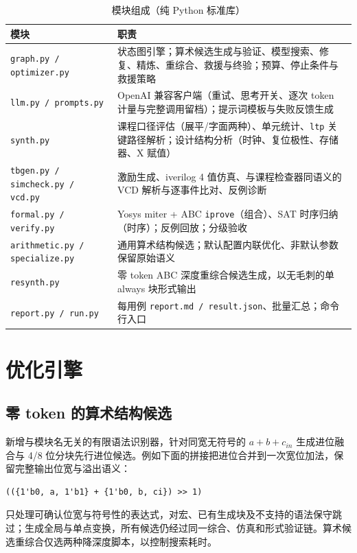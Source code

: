 \documentclass[UTF8,a4paper,zihao=5]{ctexart}
\newcommand{\code}[1]{\texttt{#1}}
\begin{document}
\begin{table}[h]\centering\small
\caption{模块组成（纯 Python 标准库）}
\begin{tabularx}{\linewidth}{@{}lX@{}}
\toprule
模块 & 职责 \\ \midrule
\code{graph.py / optimizer.py} & 状态图引擎；算术候选生成与验证、模型搜索、修复、精炼、重综合、救援与终验；预算、停止条件与救援策略 \\
\code{llm.py / prompts.py} & OpenAI 兼容客户端（重试、思考开关、逐次 token 计量与完整调用留档）；提示词模板与失败反馈生成 \\
\code{synth.py} & 课程口径评估（展平/字面两种）、单元统计、\code{ltp} 关键路径解析；设计结构分析（时钟、复位极性、存储器、X 赋值） \\
\code{tbgen.py / simcheck.py / vcd.py} & 激励生成、iverilog 4 值仿真、与课程检查器同语义的 VCD 解析与逐事件比对、反例诊断 \\
\code{formal.py / verify.py} & Yosys miter + ABC \code{iprove}（组合）、SAT 时序归纳（时序）；反例回放；分级验收 \\
\code{arithmetic.py / specialize.py} & 通用算术结构候选；默认配置内联优化、非默认参数保留原始语义 \\
\code{resynth.py} & 零 token ABC 深度重综合候选生成，以无毛刺的单 always 块形式输出 \\
\code{report.py / run.py} & 每用例 \code{report.md / result.json}、批量汇总；命令行入口 \\
\bottomrule
\end{tabularx}
\end{table}

\section{优化引擎}\label{sec:opt}

\subsection{零 token 的算术结构候选}
新增与模块名无关的有限语法识别器，针对同宽无符号的 $a+b+c_{in}$ 生成进位融合与 4/8 位分块先行进位候选。例如下面的拼接把进位合并到一次宽位加法，保留完整输出位宽与溢出语义：
\begin{lstlisting}
(({1'b0, a, 1'b1} + {1'b0, b, ci}) >> 1)
\end{lstlisting}
只处理可确认位宽与符号性的表达式，对宏、已有生成块及不支持的语法保守跳过；生成全局与单点变换，所有候选仍经过同一综合、仿真和形式验证链。算术候选重综合仅选两种降深度脚本，以控制搜索耗时。
\end{document}
